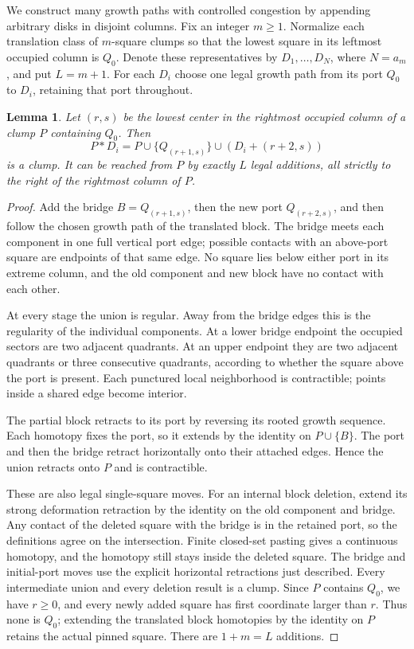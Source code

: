 \documentclass[11pt]{article}
\newtheorem{lemma}[theorem]{Lemma}
\begin{document}
We construct many growth paths with controlled congestion by appending
arbitrary disks in disjoint columns. Fix an integer $m\ge1$. Normalize
each translation class of $m$-square clumps so that the lowest square in
its leftmost occupied column is $Q_0$. Denote these representatives by
$D_1,\ldots,D_N$, where $N=a_m$, and put $L=m+1$.
For each $D_i$ choose one legal growth path from its port $Q_0$ to $D_i$,
retaining that port throughout.

\begin{lemma}\label{lem:join}
Let $(r,s)$ be the lowest center in the rightmost occupied column of a
clump $P$ containing $Q_0$. Then
\[
 P*D_i=P\cup\{Q_{(r+1,s)}\}\cup(D_i+(r+2,s))
\]
is a clump. It can be reached from $P$ by exactly $L$ legal additions,
all strictly to the right of the rightmost column of $P$.
\end{lemma}

\begin{proof}
Add the bridge $B=Q_{(r+1,s)}$, then the new port
$Q_{(r+2,s)}$, and then follow the chosen growth path of the translated
block. The bridge meets each component in one full vertical port edge;
possible contacts with an above-port square are endpoints of that same
edge. No square lies below either port in its extreme column, and the
old component and new block have no contact with each other.

At every stage the union is regular. Away from the bridge edges this is
the regularity of the individual components. At a lower bridge endpoint
the occupied sectors are two adjacent quadrants. At an upper endpoint
they are two adjacent quadrants or three consecutive quadrants, according
to whether the square above the port is present. Each punctured local
neighborhood is contractible; points inside a shared edge become interior.

The partial block retracts to its port by reversing its rooted growth
sequence. Each homotopy fixes the port, so it extends by the identity on
$P\cup\{B\}$. The port and then the bridge retract horizontally onto
their attached edges. Hence the union retracts onto $P$ and is contractible.

These are also legal single-square moves. For an internal block deletion,
extend its strong deformation retraction by the identity on the old
component and bridge. Any contact of the deleted square with the bridge
is in the retained port, so the definitions agree on the intersection.
Finite closed-set pasting gives a continuous homotopy, and the homotopy
still stays inside the deleted square. The bridge and initial-port moves
use the explicit horizontal retractions just described. Every intermediate
union and every deletion result is a clump. Since $P$ contains $Q_0$,
we have $r\ge0$, and every newly added square has first coordinate larger
than $r$. Thus none is $Q_0$; extending the translated block homotopies
by the identity on $P$ retains the actual pinned square. There are
$1+m=L$ additions.
\end{proof}
\end{document}
